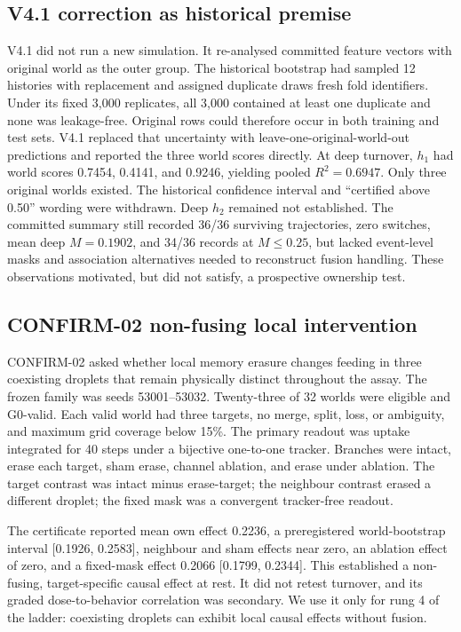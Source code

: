\documentclass[11pt]{article}
\begin{document}
\subsection{V4.1 correction as historical premise}

V4.1 did not run a new simulation. It re-analysed committed feature vectors with original world as the outer group. The historical bootstrap had sampled 12 histories with replacement and assigned duplicate draws fresh fold identifiers. Under its fixed 3,000 replicates, all 3,000 contained at least one duplicate and none was leakage-free. Original rows could therefore occur in both training and test sets. V4.1 replaced that uncertainty with leave-one-original-world-out predictions and reported the three world scores directly. At deep turnover, $h_1$ had world scores 0.7454, 0.4141, and 0.9246, yielding pooled $R^2=0.6947$. Only three original worlds existed. The historical confidence interval and ``certified above 0.50'' wording were withdrawn. Deep $h_2$ remained not established. The committed summary still recorded 36/36 surviving trajectories, zero switches, mean deep $M=0.1902$, and 34/36 records at $M\le0.25$, but lacked event-level masks and association alternatives needed to reconstruct fusion handling. These observations motivated, but did not satisfy, a prospective ownership test.

\subsection{CONFIRM-02 non-fusing local intervention}

CONFIRM-02 asked whether local memory erasure changes feeding in three coexisting droplets that remain physically distinct throughout the assay. The frozen family was seeds 53001--53032. Twenty-three of 32 worlds were eligible and G0-valid. Each valid world had three targets, no merge, split, loss, or ambiguity, and maximum grid coverage below 15\%. The primary readout was uptake integrated for 40 steps under a bijective one-to-one tracker. Branches were intact, erase each target, sham erase, channel ablation, and erase under ablation. The target contrast was intact minus erase-target; the neighbour contrast erased a different droplet; the fixed mask was a convergent tracker-free readout.

The certificate reported mean own effect 0.2236, a preregistered world-bootstrap interval [0.1926, 0.2583], neighbour and sham effects near zero, an ablation effect of zero, and a fixed-mask effect 0.2066 [0.1799, 0.2344]. This established a non-fusing, target-specific causal effect at rest. It did not retest turnover, and its graded dose-to-behavior correlation was secondary. We use it only for rung 4 of the ladder: coexisting droplets can exhibit local causal effects without fusion.
\end{document}
